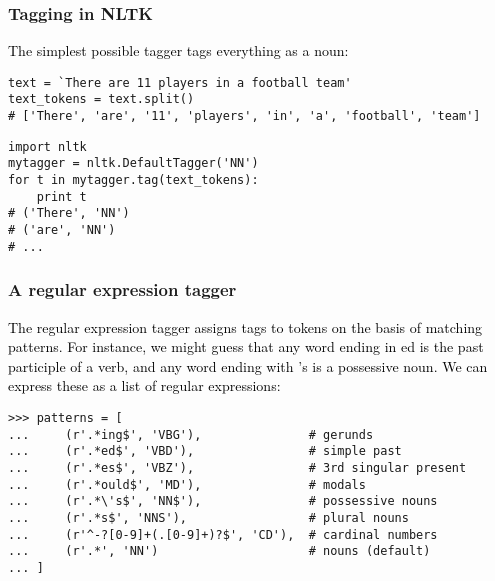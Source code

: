 \begin{frame}[fragile]\frametitle{Tagging in NLTK}
\textcolor{black}{The simplest possible tagger tags everything as a noun:}
\small
\begin{lstlisting}
text = `There are 11 players in a football team'
text_tokens = text.split()
# ['There', 'are', '11', 'players', 'in', 'a', 'football', 'team']
\end{lstlisting}
  
\begin{lstlisting}
import nltk
mytagger = nltk.DefaultTagger('NN')
for t in mytagger.tag(text_tokens):
    print t
# ('There', 'NN')
# ('are', 'NN')
# ...
\end{lstlisting}
\end{frame}
%
%
%  


\begin{frame}[fragile]\frametitle{A regular expression tagger}
\textcolor{black}{
The regular expression tagger assigns tags to tokens on the basis of matching patterns. For instance, we might guess that any word ending in ed is the past participle of a verb, and any word ending with 's is a possessive noun. We can express these as a list of regular expressions:}
\small
\begin{lstlisting}
>>> patterns = [
...     (r'.*ing$', 'VBG'),               # gerunds
...     (r'.*ed$', 'VBD'),                # simple past
...     (r'.*es$', 'VBZ'),                # 3rd singular present
...     (r'.*ould$', 'MD'),               # modals
...     (r'.*\'s$', 'NN$'),               # possessive nouns
...     (r'.*s$', 'NNS'),                 # plural nouns
...     (r'^-?[0-9]+(.[0-9]+)?$', 'CD'),  # cardinal numbers
...     (r'.*', 'NN')                     # nouns (default)
... ]
\end{lstlisting}
\end{frame}

